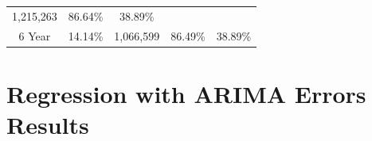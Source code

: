 \documentclass[12pt,oneside]{chicagocapstone}
\begin{document}
\begin{longtable}[]{@{}ccccc@{}}
\begin{minipage}[t]{0.15\columnwidth}
1,215,263\strut
\end{minipage} & \begin{minipage}[t]{0.16\columnwidth}\centering\strut
86.64\%\strut
\end{minipage} & \begin{minipage}[t]{0.16\columnwidth}\centering\strut
38.89\%\strut
\end{minipage}\tabularnewline
\begin{minipage}[t]{0.22\columnwidth}\centering\strut
6 Year\strut
\end{minipage} & \begin{minipage}[t]{0.16\columnwidth}\centering\strut
14.14\%\strut
\end{minipage} & \begin{minipage}[t]{0.15\columnwidth}\centering\strut
1,066,599\strut
\end{minipage} & \begin{minipage}[t]{0.16\columnwidth}\centering\strut
86.49\%\strut
\end{minipage} & \begin{minipage}[t]{0.16\columnwidth}\centering\strut
38.89\%\strut
\end{minipage}\tabularnewline
\bottomrule
\end{longtable}
\section*{Regression with ARIMA Errors
Results}\label{regression-with-arima-errors-results}
\end{document}
